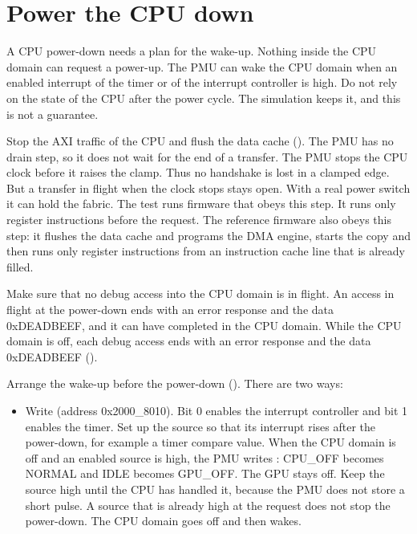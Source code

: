 \section{Power the CPU down}\label{um:ch:power-integration:cpu}
A CPU power-down needs a plan for the wake-up. Nothing inside the CPU domain can request a power-up. The PMU can wake the CPU domain when an enabled interrupt of the timer or of the interrupt controller is high. Do not rely on the state of the CPU after the power cycle. The simulation keeps it, and this is not a guarantee.

\begin{procedure}
  \item Stop the AXI traffic of the CPU and flush the data cache (). The PMU has no drain step, so it does not wait for the end of a transfer. The PMU stops the CPU clock before it raises the clamp. Thus no handshake is lost in a clamped edge. But a transfer in flight when the clock stops stays open. With a real power switch it can hold the fabric. The test  runs firmware that obeys this step. It runs only register instructions before the request. The reference firmware also obeys this step: it flushes the data cache and programs the DMA engine, starts the copy and then runs only register instructions from an instruction cache line that is already filled.
  \item Make sure that no debug access into the CPU domain is in flight. An access in flight at the power-down ends with an error response and the data 0xDEADBEEF, and it can have completed in the CPU domain. While the CPU domain is off, each debug access ends with an error response and the data 0xDEADBEEF ().
  \item Arrange the wake-up before the power-down (). There are two ways:
  \begin{itemize}
    \item Write  (address 0x2000\_8010). Bit 0 enables the interrupt controller and bit 1 enables the timer. Set up the source so that its interrupt rises after the power-down, for example a timer compare value. When the CPU domain is off and an enabled source is high, the PMU writes : CPU\_OFF becomes NORMAL and IDLE becomes GPU\_OFF. The GPU stays off. Keep the source high until the CPU has handled it, because the PMU does not store a short pulse. A source that is already high at the request does not stop the power-down. The CPU domain goes off and then wakes.

\end{itemize}
\end{procedure}
